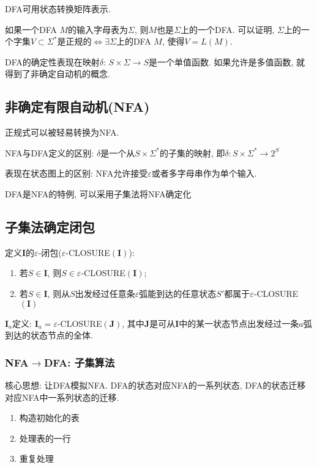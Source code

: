         DFA可用\textsf{状态转换矩阵}表示.

        如果一个DFA $M$的输入字母表为$\Sigma$, 则$M$也是$\Sigma$上的一个DFA. 可以证明, $\Sigma$上的一个字集$V\subset\Sigma^*$是正规的$\iff \exists\Sigma$上的DFA $M$, 使得$V=L(M)$.

        DFA的确定性表现在映射$\delta$: $S\times\Sigma\to S$是一个单值函数. 如果允许是多值函数, 就得到了非确定自动机的概念.


    \subsection{非确定有限自动机(NFA)}
        
        正规式可以被轻易转换为NFA.

        NFA与DFA定义的区别: $\delta$是一个从$S\times\Sigma^*$的子集的映射, 即$\delta: S\times\Sigma^*\to2^S$

        表现在状态图上的区别: NFA允许接受$\varepsilon$或者多字母串作为单个输入. 

        DFA是NFA的特例, 可以采用子集法将NFA确定化

    \subsection{子集法确定闭包}

        定义$\mathbf{I}$的$\varepsilon$-闭包($\varepsilon$-CLOSURE$(\mathbf{I})$):
        \begin{enumerate}
            \item 若$S\in \mathbf{I}$, 则$S\in \varepsilon$-CLOSURE$(\mathbf{I})$;
            \item 若$S\in \mathbf{I}$, 则从$S$出发经过任意条$\varepsilon$弧能到达的任意状态$S'$都属于$\varepsilon$-CLOSURE$(\mathbf{I})$
        \end{enumerate}

        $\mathbf{I}_a$定义: $\mathbf{I}_a=\varepsilon$-CLOSURE$(\mathbf{J})$, 其中$\mathbf{J}$是可从$\mathbf{I}$中的某一状态节点出发经过一条$a$弧到达的状态节点的全体.

    \subsubsection{NFA$\to$DFA: 子集算法}

        核心思想: 让DFA模拟NFA. DFA的状态对应NFA的一系列状态, DFA的状态迁移对应NFA中一系列状态的迁移.

        \begin{enumerate}
            \item 构造初始化的表
            \item 处理表的一行
            \item 重复处理
        \end{enumerate}

